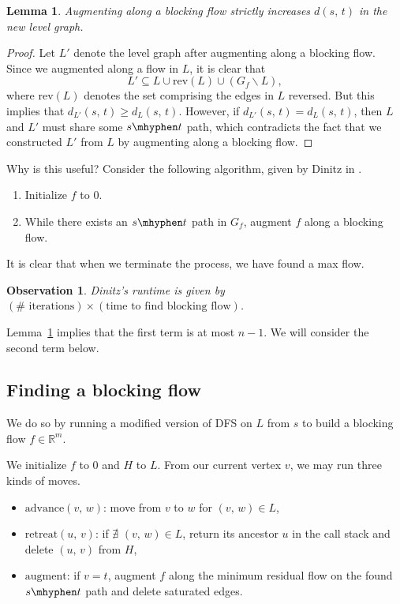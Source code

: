 \documentclass[11pt]{article}
\newtheorem{lemma}{Lemma}[section]
\newtheorem{observation}{Observation}
\begin{document}
\begin{lemma}\label{increased}
Augmenting along a blocking flow strictly increases $d(s,\, t)$  in the new level graph.
\end{lemma}
\begin{proof}
Let $L'$ denote the level graph after augmenting along a blocking flow. Since we augmented along a flow in $L$, it is clear that $$L'\subseteq L\cup\text{rev}(L)\cup (G_f\backslash L),$$ where $\text{rev}(L)$ denotes the set comprising the edges in $L$ reversed. But this implies that $d_{\scriptscriptstyle L'}(s,\, t)\geq d_{\scriptscriptstyle L}(s,\, t)$. However, if $d_{\scriptscriptstyle L'}(s,\, t)=d_{\scriptscriptstyle L}(s,\, t)$, then $L$ and $L'$ must share some $s\mhyphen t$ path, which contradicts the fact that we constructed $L'$ from $L$ by augmenting along a blocking flow.
\end{proof}

Why is this useful? Consider the following algorithm, given by Dinitz in \cite{Dinitz}. 
\begin{enumerate}
\item Initialize $f$ to 0.
\item While there exists an $s\mhyphen t$ path in $G_f$, augment $f$ along a blocking flow.
\end{enumerate}

It is clear that when we terminate the process, we have found a max flow. 

\begin{observation}\label{runtime}
Dinitz's runtime is given by $(\#\text{ iterations})\times(\text{time to find blocking flow})$.
\end{observation} 
Lemma~\ref{increased} implies that the first term is at most $n-1$. We will consider the second term below. 

\subsection{Finding a blocking flow}\label{findflow}
We do so by running a modified version of DFS on $L$ from $s$ to build a blocking flow $f\in\mathbb{R}^m$. 

We initialize $f$ to 0 and $H$ to $L$. From our current vertex $v$, we may run three kinds of moves.
\begin{itemize}
\item $\text{advance}(v,\, w)$: move from $v$ to $w$ for $(v,\, w)\in L$,
\item $\text{retreat}(u,\, v)$: if $\nexists$ $(v,\, w)\in L$, return its ancestor $u$ in the call stack and delete $(u,\, v)$ from $H$,
\item $\text{augment}$: if $v=t$, augment $f$ along the minimum residual flow on the found $s\mhyphen t$ path and delete saturated edges.
\end{itemize}
\end{document}
